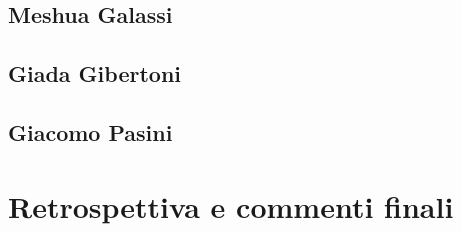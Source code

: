         
        \section{Meshua Galassi}\label{sec:galassi}
            

        \clearpage
    
        \section{Giada Gibertoni}\label{sec:gibertoni}
            
        
        
        \section{Giacomo Pasini}\label{sec:pasini}
            

    \clearpage

    \chapter{Retrospettiva e commenti finali}\label{ch:retrospective}
        
        

